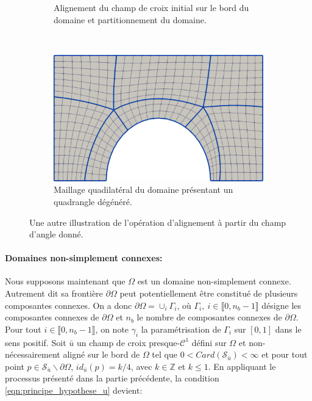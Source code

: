 \begin{figure}[!h]
\begin{subfigure}{0.58\textwidth}
    \caption{Alignement du champ de croix initial sur le bord du domaine et partitionnement du domaine.}
    \label{fig:rect_demi_disc_second}
\end{subfigure}
\\[0.46cm]
\begin{subfigure}{0.58\textwidth}
    \includegraphics[width=\textwidth]{images/rect_demi_disc_third.pdf}
    \caption{Maillage quadilatéral du domaine présentant un quadrangle dégénéré.}
    \label{fig:rect_demi_disc_third}
\end{subfigure}

\caption{Une autre illustration de l'opération d'alignement à partir du champ d'angle donné.}
\label{fig:rect_demi_disc}
\end{figure}

\paragraph{Domaines non-simplement connexes:}
Nous supposons maintenant que $\Omega$ est un domaine non-simplement connexe. Autrement dit sa frontière $\partial\Omega$ peut potentiellement être constitué de plusieurs composantes connexes. On a donc $\partial\Omega=\cup_i\Gamma_i$, où $\Gamma_i,~i\in\llbracket 0, n_b-1\rrbracket$ désigne les composantes connexes de $\partial\Omega$ et $n_b$ le nombre de composantes connexes de $\partial\Omega$. Pour tout $i\in\llbracket0, n_b-1\rrbracket$, on note $\gamma_i$ la paramétrisation de $\Gamma_i$ sur $[0, 1]$ dans le sens positif. Soit $\bar{u}$ un champ de croix presque-$\mathcal{C}^1$ défini sur $\Omega$ et non-nécessairement aligné sur le bord de $\Omega$ tel que $0<Card(\mathcal{S}_{\bar{u}})<\infty$ et pour tout point $p\in\mathcal{S}_{\bar{u}}\backslash\partial\Omega$, $id_{\bar{u}}(p)=k/4$, avec $k\in\mathbb{Z}$ et $k\leq 1$. En appliquant le processus présenté dans la partie précédente, la condition \eqref{eqn:principe_hypothese_u} devient:


